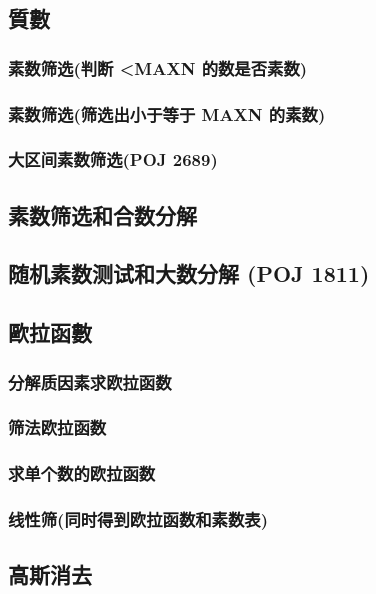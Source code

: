 	\subsection{質數}
		\subsubsection{素数筛选(判断 <MAXN 的数是否素数)}
			
		\subsubsection{素数筛选(筛选出小于等于 MAXN 的素数)}
			
		\subsubsection{大区间素数筛选(POJ 2689)}
			
	\subsection{素数筛选和合数分解}
		
	\subsection{随机素数测试和大数分解 (POJ 1811)}
		
	\subsection{歐拉函數}
		\subsubsection{分解质因素求欧拉函数}
			
		\subsubsection{筛法欧拉函数}
			
		\subsubsection{求单个数的欧拉函数}
			
		\subsubsection{线性筛(同时得到欧拉函数和素数表)}
			
	\subsection{高斯消去}
		

